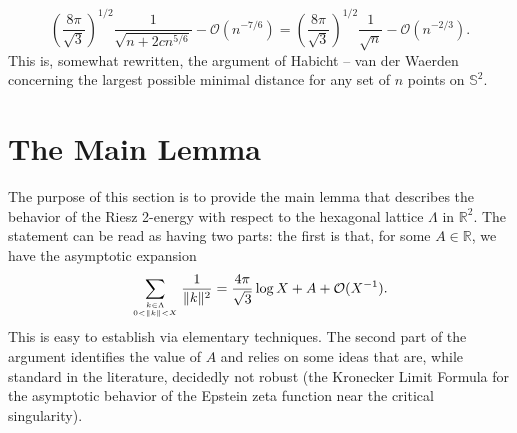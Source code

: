 \documentclass[10pt, reqno]{amsart}
\begin{document}
$$ \left( \frac{8 \pi}{\sqrt{3}} \right)^{1/2} \frac{1}{\sqrt{n + 2 c n^{5/6}}}  - \mathcal{O}(n^{-7/6}) = \left( \frac{8 \pi}{\sqrt{3}} \right)^{1/2} \frac{1}{\sqrt{n}} - \mathcal{O}(n^{-2/3}).$$
 This is, somewhat rewritten, the argument of Habicht -- van der Waerden concerning the largest possible minimal distance for any set of $n$ points on $\mathbb{S}^2$.
  
 
\section{The Main Lemma} 
The purpose of this section is to provide the main lemma that describes the behavior of the Riesz 2-energy with respect to the hexagonal lattice $\Lambda$ in $\mathbb{R}^2$.  The statement can be read as having two parts: the first is that, for some $A \in \mathbb{R}$, we have the asymptotic expansion
$$  \sum_{k \in \Lambda \atop 0 < \|k\| < X} \frac{1}{\|k\|^2} = \frac{4\pi}{\sqrt{3}} \log{X} + A + \mathcal{O}(X^{-1}).$$
This is easy to establish via elementary techniques. The second part of the argument identifies the value of $A$ and relies on some ideas that are, while standard in the literature, decidedly not robust (the Kronecker Limit Formula for the asymptotic behavior of the Epstein zeta function near the critical singularity).
\end{document}
